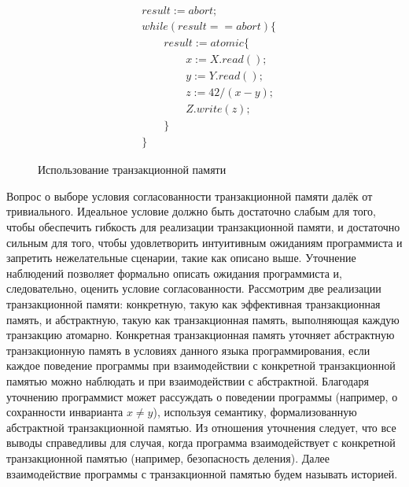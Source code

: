 \begin{figure}[t]
\begin{align*}
&result := abort;\\
&while \left (result == abort \right) \{ \\
& \qquad result := atomic \{ \\
& \qquad \qquad x := X.read(); \\
& \qquad \qquad y := Y.read(); \\ 
& \qquad \qquad z := 42 / (x - y); \\
& \qquad \qquad Z.write(z); \\
& \qquad \} \\
&\}
\end{align*}
\caption{Использование транзакционной памяти}
\label{fig:tm}
\end{figure}
Вопрос о выборе условия согласованности транзакционной памяти далёк от тривиального. Идеальное условие должно быть достаточно слабым для того, чтобы обеспечить гибкость для реализации транзакционной памяти, и достаточно сильным для того, чтобы удовлетворить интуитивным ожиданиям программиста и запретить нежелательные сценарии, такие как описано выше. Уточнение наблюдений %
позволяет формально описать ожидания программиста и, следовательно, оценить условие согласованности. Рассмотрим две реализации транзакционной памяти: конкретную, такую как эффективная транзакционная память, и абстрактную, такую как транзакционная память, выполняющая каждую транзакцию атомарно. Конкретная транзакционная память уточняет абстрактную транзакционную память в условиях данного языка программирования, если каждое поведение программы при взаимодействии с конкретной транзакционной памятью можно наблюдать и при взаимодействии с абстрактной. Благодаря уточнению программист может рассуждать о поведении программы (например, о сохранности инварианта $x \neq y$), используя семантику, формализованную абстрактной транзакционной памятью. Из отношения уточнения следует, что все выводы справедливы для случая, когда программа взаимодействует с конкретной транзакционной памятью (например, безопасность деления). Далее взаимодействие программы с транзакционной памятью будем называть историей.    


